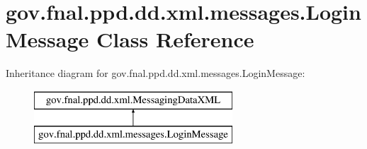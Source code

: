 \hypertarget{classgov_1_1fnal_1_1ppd_1_1dd_1_1xml_1_1messages_1_1LoginMessage}{\section{gov.\-fnal.\-ppd.\-dd.\-xml.\-messages.\-Login\-Message Class Reference}
\label{classgov_1_1fnal_1_1ppd_1_1dd_1_1xml_1_1messages_1_1LoginMessage}
}
Inheritance diagram for gov.\-fnal.\-ppd.\-dd.\-xml.\-messages.\-Login\-Message\-:\begin{figure}[H]
\begin{center}
\leavevmode
\includegraphics[height=2.000000cm]{classgov_1_1fnal_1_1ppd_1_1dd_1_1xml_1_1messages_1_1LoginMessage}
\end{center}
\end{figure}
